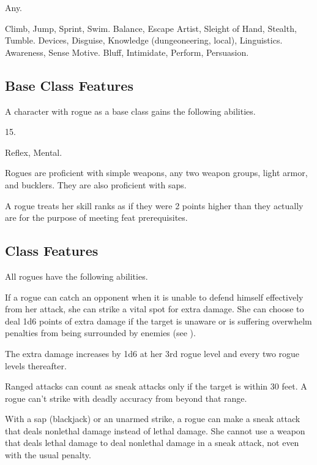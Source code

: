  Any.

 Climb, Jump, Sprint, Swim.
 Balance, Escape Artist, Sleight of Hand, Stealth, Tumble.
 Devices, Disguise, Knowledge (dungeoneering, local), Linguistics.
 Awareness, Sense Motive.
 Bluff, Intimidate, Perform, Persuasion.

\subsection{Base Class Features}
A character with rogue as a base class gains the following abilities.

 15.

  Reflex,  Mental.

Rogues are proficient with simple weapons, any two weapon groups, light armor, and bucklers.
They are also proficient with saps.

A rogue treats her skill ranks as if they were 2 points higher than they actually are for the purpose of meeting feat prerequisites.

\subsection{Class Features}
All rogues have the following abilities.

If a rogue can catch an opponent when it is unable to defend himself effectively from her attack, she can strike a vital spot for extra damage.
She can choose to deal 1d6 points of extra damage if the target is unaware or is suffering overwhelm penalties from being surrounded by enemies (see ).

The extra damage increases by 1d6 at her 3rd rogue level and every two rogue levels thereafter.

\par Ranged attacks can count as sneak attacks only if the target is within 30 feet.
A rogue can't strike with deadly accuracy from beyond that range.

With a sap (blackjack) or an unarmed strike, a rogue can make a sneak attack that deals nonlethal damage instead of lethal damage.
She cannot use a weapon that deals lethal damage to deal nonlethal damage in a sneak attack, not even with the usual  penalty.

